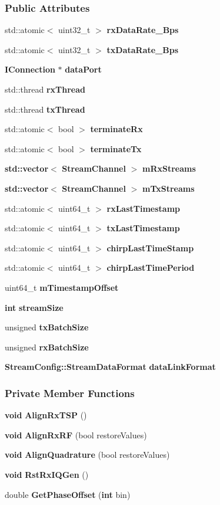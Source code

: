 \subsubsection*{Public Attributes}
\begin{DoxyCompactItemize}
\item 
std\+::atomic$<$ uint32\+\_\+t $>$ {\bf rx\+Data\+Rate\+\_\+\+Bps}
\item 
std\+::atomic$<$ uint32\+\_\+t $>$ {\bf tx\+Data\+Rate\+\_\+\+Bps}
\item 
{\bf I\+Connection} $\ast$ {\bf data\+Port}
\item 
std\+::thread {\bf rx\+Thread}
\item 
std\+::thread {\bf tx\+Thread}
\item 
std\+::atomic$<$ bool $>$ {\bf terminate\+Rx}
\item 
std\+::atomic$<$ bool $>$ {\bf terminate\+Tx}
\item 
{\bf std\+::vector}$<$ {\bf Stream\+Channel} $>$ {\bf m\+Rx\+Streams}
\item 
{\bf std\+::vector}$<$ {\bf Stream\+Channel} $>$ {\bf m\+Tx\+Streams}
\item 
std\+::atomic$<$ uint64\+\_\+t $>$ {\bf rx\+Last\+Timestamp}
\item 
std\+::atomic$<$ uint64\+\_\+t $>$ {\bf tx\+Last\+Timestamp}
\item 
std\+::atomic$<$ uint64\+\_\+t $>$ {\bf chirp\+Last\+Time\+Stamp}
\item 
std\+::atomic$<$ uint64\+\_\+t $>$ {\bf chirp\+Last\+Time\+Period}
\item 
uint64\+\_\+t {\bf m\+Timestamp\+Offset}
\item 
{\bf int} {\bf stream\+Size}
\item 
unsigned {\bf tx\+Batch\+Size}
\item 
unsigned {\bf rx\+Batch\+Size}
\item 
{\bf Stream\+Config\+::\+Stream\+Data\+Format} {\bf data\+Link\+Format}
\end{DoxyCompactItemize}
\subsubsection*{Private Member Functions}
\begin{DoxyCompactItemize}
\item 
{\bf void} {\bf Align\+Rx\+T\+SP} ()
\item 
{\bf void} {\bf Align\+Rx\+RF} (bool restore\+Values)
\item 
{\bf void} {\bf Align\+Quadrature} (bool restore\+Values)
\item 
{\bf void} {\bf Rst\+Rx\+I\+Q\+Gen} ()
\item 
double {\bf Get\+Phase\+Offset} ({\bf int} bin)
\end{DoxyCompactItemize}

